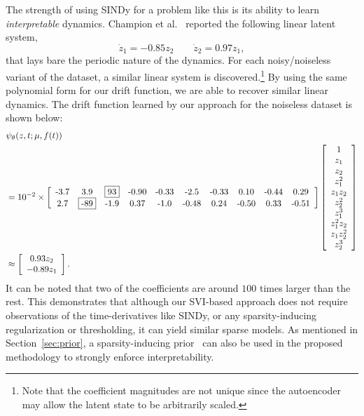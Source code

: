 \documentclass{article}
\begin{document}
	The strength of using SINDy for a problem like this is its ability to learn \emph{interpretable} dynamics. Champion et al.~\cite{Champion_2019_Data_Driven_Coordinates} reported the following linear latent system,
	\begin{equation*}
		\dot{z}_1 = -0.85 z_2 \qquad \dot{z}_2 = 0.97 z_1,
	\end{equation*}
	that lays bare the periodic nature of the dynamics. For each noisy/noiseless variant of the dataset, a similar linear system is discovered.\footnote{Note that the coefficient magnitudes are not unique since the autoencoder may allow the latent state to be arbitrarily scaled.} By using the same polynomial form for our drift function, we are able to recover similar linear dynamics. The drift function learned by our approach for the noiseless dataset is shown below:
	\begin{equation*}
		\begin{aligned}
			& \psi_{\theta}(z, t; \mu, f(t)) \\
			& = 10^{-2}\times \bmat{cccccccccc} \mbox{-}3.7 & 3.9 & \fbox{93} & \mbox{-}0.90 & \mbox{-}0.33 & \mbox{-}2.5 & \mbox{-}0.33 & 0.10 & \mbox{-}0.44 & 0.29 \\
			2.7 & \fbox{-89} & \mbox{-}1.9 & 0.37 & \mbox{-}1.0 & \mbox{-}0.48 & 0.24 & \mbox{-}0.50 & 0.33 & \mbox{-}0.51 \emat \bmat{c}1 \\ z_1 \\ z_2 \\ z_1^2 \\ z_1 z_2 \\ z_2^2 \\ z_1^3 \\ z_1^2 z_2 \\ z_1 z_2^2 \\ z_2^3 \emat \\ & \approx \bmat{c}0.93 z_2 \\ -0.89 z_1\emat.
		\end{aligned}
	\end{equation*}
	It can be noted that two of the coefficients are around $100$ times larger than the rest. This demonstrates that although our SVI-based approach does not require observations of the time-derivatives like SINDy, or any sparsity-inducing regularization or thresholding, it can yield similar sparse models. As mentioned in Section~\ref{sec:prior}, a sparsity-inducing prior~\cite{Course_2023_State_Estimation} can also be used in the proposed methodology to strongly enforce interpretability.
	
\end{document}
